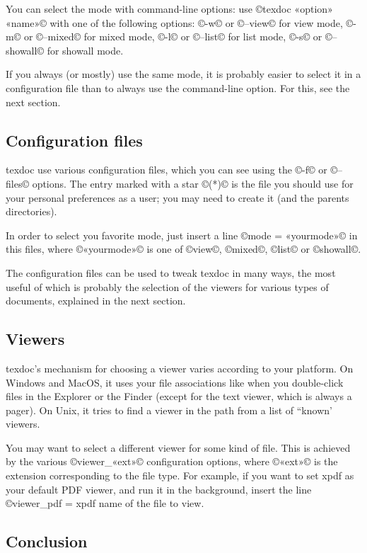 \documentclass[a4paper, oneside]{scrartcl}
\newcommand\texdoc{texdoc\xspace}
\begin{document}
You can select the mode with command-line options: use 
©texdoc «option» «name»© with
one of the following options: ©-w© or ©--view© for view mode, ©-m© or
©--mixed© for mixed mode, ©-l© or ©--list© for list mode, ©-s© or ©--showall©
for showall mode.

If you always (or mostly) use the same mode, it is probably easier to
select it in a configuration file than to always use the command-line
option. For this, see the next section.

\subsection{Configuration files}\label{ss-quick-file}

\texdoc use various configuration files, which you can see using the ©-f© or
©--files© options. The entry marked with a star ©(*)©
is the file you should use for your personal preferences as a user; you may
need to create it (and the parents directories).

In order to select you favorite mode, just insert a line ©mode = «yourmode»©
in this files, where ©«yourmode»© is one of ©view©, ©mixed©, ©list© or
©showall©.

The configuration files can be used to tweak \texdoc in many ways, the most
useful of which is probably the selection of the viewers for various types of
documents, explained in the next section.

\subsection{Viewers}

\texdoc's mechanism for choosing a viewer varies according to your platform.
On Windows and MacOS, it uses your file associations like when you
double-click files in the Explorer or the Finder (except for the text viewer,
which is always a pager). On Unix, it tries to find a viewer in the path from
a list of ``known' viewers.

You may want to select a different viewer for some kind of file. This is
achieved by the various ©viewer_«ext»© configuration options, where ©«ext»© is
the extension corresponding to the file type. For example, if you want to set
xpdf as your default PDF viewer, and run it in the background, insert the line
©viewer_pdf = xpdf %
name of the file to view.

\subsection{Conclusion}
\end{document}
